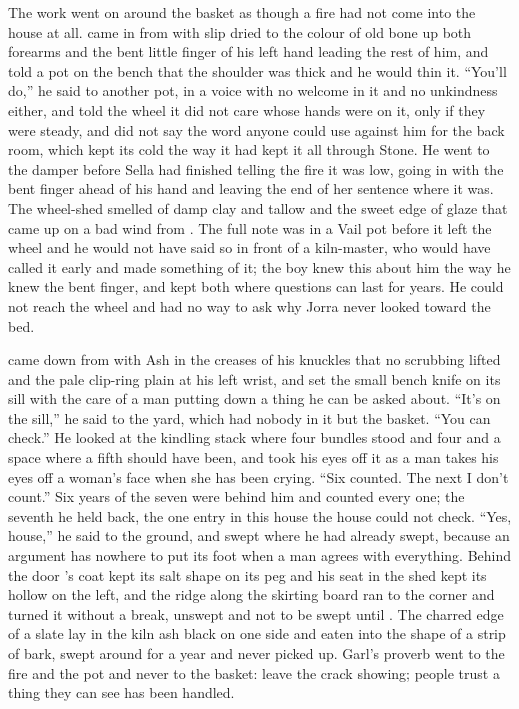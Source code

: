 The work went on around the basket as though a fire had not come into the house at all.  came in from  with slip dried to the colour of old bone up both forearms and the bent little finger of his left hand leading the rest of him, and told a pot on the bench that the shoulder was thick and he would thin it. “You'll do,” he said to another pot, in a voice with no welcome in it and no unkindness either, and told the wheel it did not care whose hands were on it, only if they were steady, and did not say the word anyone could use against him for the back room, which kept its cold the way it had kept it all through Stone. He went to the damper before Sella had finished telling the fire it was low, going in with the bent finger ahead of his hand and leaving the end of her sentence where it was. The wheel-shed smelled of damp clay and tallow and the sweet edge of glaze that came up on a bad wind from . The full note was in a Vail pot before it left the wheel and he would not have said so in front of a kiln-master, who would have called it early and made something of it; the boy knew this about him the way he knew the bent finger, and kept both where questions can last for years. He could not reach the wheel and had no way to ask why Jorra never looked toward the bed.

 came down from  with Ash in the creases of his knuckles that no scrubbing lifted and the pale clip-ring plain at his left wrist, and set the small bench knife on its sill with the care of a man putting down a thing he can be asked about. “It's on the sill,” he said to the yard, which had nobody in it but the basket. “You can check.” He looked at the kindling stack where four bundles stood and four and a space where a fifth should have been, and took his eyes off it as a man takes his eyes off a woman's face when she has been crying. “Six counted. The next I don't count.” Six years of the seven were behind him and counted every one; the seventh he held back, the one entry in this house the house could not check. “Yes, house,” he said to the ground, and swept where he had already swept, because an argument has nowhere to put its foot when a man agrees with everything. Behind the door 's coat kept its salt shape on its peg and his seat in the shed kept its hollow on the left, and the ridge along the skirting board ran to the corner and turned it without a break, unswept and not to be swept until . The charred edge of a slate lay in the kiln ash black on one side and eaten into the shape of a strip of bark, swept around for a year and never picked up. Garl's proverb went to the fire and the pot and never to the basket: leave the crack showing; people trust a thing they can see has been handled.

